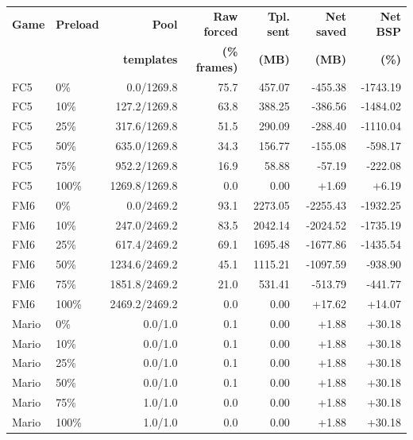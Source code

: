 \begin{tabular}{@{}llrrrrr@{}}
\toprule
\textbf{Game} & \textbf{Preload} & \textbf{Pool} & \textbf{Raw forced} & \textbf{Tpl. sent} & \textbf{Net saved} & \textbf{Net BSP} \\
 & & \textbf{templates} & \textbf{(\% frames)} & \textbf{(MB)} & \textbf{(MB)} & \textbf{(\%)} \\
\midrule
FC5 & 0\% & 0.0/1269.8 & 75.7 & 457.07 & -455.38 & -1743.19 \\
FC5 & 10\% & 127.2/1269.8 & 63.8 & 388.25 & -386.56 & -1484.02 \\
FC5 & 25\% & 317.6/1269.8 & 51.5 & 290.09 & -288.40 & -1110.04 \\
FC5 & 50\% & 635.0/1269.8 & 34.3 & 156.77 & -155.08 & -598.17 \\
FC5 & 75\% & 952.2/1269.8 & 16.9 & 58.88 & -57.19 & -222.08 \\
FC5 & 100\% & 1269.8/1269.8 & 0.0 & 0.00 & +1.69 & +6.19 \\
\midrule
FM6 & 0\% & 0.0/2469.2 & 93.1 & 2273.05 & -2255.43 & -1932.25 \\
FM6 & 10\% & 247.0/2469.2 & 83.5 & 2042.14 & -2024.52 & -1735.19 \\
FM6 & 25\% & 617.4/2469.2 & 69.1 & 1695.48 & -1677.86 & -1435.54 \\
FM6 & 50\% & 1234.6/2469.2 & 45.1 & 1115.21 & -1097.59 & -938.90 \\
FM6 & 75\% & 1851.8/2469.2 & 21.0 & 531.41 & -513.79 & -441.77 \\
FM6 & 100\% & 2469.2/2469.2 & 0.0 & 0.00 & +17.62 & +14.07 \\
\midrule
Mario & 0\% & 0.0/1.0 & 0.1 & 0.00 & +1.88 & +30.18 \\
Mario & 10\% & 0.0/1.0 & 0.1 & 0.00 & +1.88 & +30.18 \\
Mario & 25\% & 0.0/1.0 & 0.1 & 0.00 & +1.88 & +30.18 \\
Mario & 50\% & 0.0/1.0 & 0.1 & 0.00 & +1.88 & +30.18 \\
Mario & 75\% & 1.0/1.0 & 0.0 & 0.00 & +1.88 & +30.18 \\
Mario & 100\% & 1.0/1.0 & 0.0 & 0.00 & +1.88 & +30.18 \\
\bottomrule
\end{tabular}
